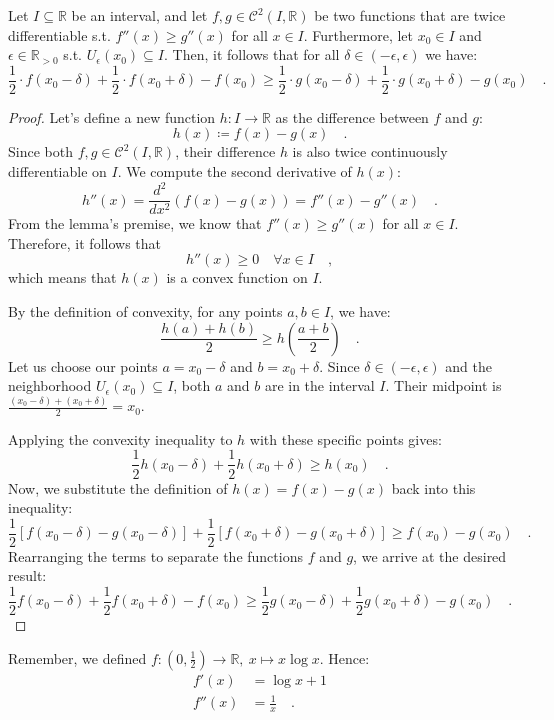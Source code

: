\documentclass[../../main.tex]{subfiles}
\begin{document}
\begin{lemma}
    \label{lemma:convex_function_bound}
    Let $I \subseteq \mathbb{R}$ be an interval, and let $f, g \in \mathcal{C}^2(I, \mathbb{R})$ be two functions that are twice differentiable s.t. $f''(x) \geq g''(x)$ for all $x \in I$. Furthermore, let $x_0 \in I$ and $\epsilon \in \mathbb{R}_{>0}$ s.t. $U_\epsilon(x_0) \subseteq I$. Then, it follows that for all $\delta \in (-\epsilon, \epsilon)$ we have:
    \[
        \frac{1}{2} \cdot f(x_0 - \delta) + \frac{1}{2} \cdot f(x_0 + \delta) - f(x_0) \geq \frac{1}{2} \cdot g(x_0 - \delta) + \frac{1}{2} \cdot g(x_0 + \delta) - g(x_0) \quad .
    \]
\end{lemma}
\begin{proof}
Let's define a new function $h: I \to \mathbb{R}$ as the difference between $f$ and $g$:
\[
    h(x) \coloneqq f(x) - g(x) \quad .
\]
Since both $f, g \in \mathcal{C}^2(I, \mathbb{R})$, their difference $h$ is also twice continuously differentiable on $I$. We compute the second derivative of $h(x)$:
\[
    h''(x) = \frac{d^2}{dx^2}(f(x) - g(x)) = f''(x) - g''(x) \quad .
\]
From the lemma's premise, we know that $f''(x) \geq g''(x)$ for all $x \in I$. Therefore, it follows that
\[
    h''(x) \geq 0 \quad \forall x \in I \quad ,
\]
which means that $h(x)$ is a convex function on $I$.

By the definition of convexity, for any points $a, b \in I$, we have:
\[
    \frac{h(a) + h(b)}{2} \geq h\left(\frac{a+b}{2}\right) \quad .
\]
Let us choose our points $a = x_0 - \delta$ and $b = x_0 + \delta$. Since $\delta \in (-\epsilon, \epsilon)$ and the neighborhood $U_\epsilon(x_0) \subseteq I$, both $a$ and $b$ are in the interval $I$. Their midpoint is $\frac{(x_0 - \delta) + (x_0 + \delta)}{2} = x_0$.

Applying the convexity inequality to $h$ with these specific points gives:
\[
    \frac{1}{2} h(x_0 - \delta) + \frac{1}{2} h(x_0 + \delta) \geq h(x_0) \quad .
\]
Now, we substitute the definition of $h(x) = f(x) - g(x)$ back into this inequality:
\[
    \frac{1}{2} [f(x_0 - \delta) - g(x_0 - \delta)] + \frac{1}{2} [f(x_0 + \delta) - g(x_0 + \delta)] \geq f(x_0) - g(x_0) \quad .
\]
Rearranging the terms to separate the functions $f$ and $g$, we arrive at the desired result:
\[
    \frac{1}{2} f(x_0 - \delta) + \frac{1}{2} f(x_0 + \delta) - f(x_0) \geq \frac{1}{2} g(x_0 - \delta) + \frac{1}{2} g(x_0 + \delta) - g(x_0) \quad .
\]
\end{proof}

Remember, we defined $f: (0, \frac{1}{2}) \to \mathbb{R}, \ x \mapsto x \log x$. Hence:
\begin{align*}
    f'(x) &= \log x + 1 \\
    f''(x) &= \frac{1}{x} \quad .
\end{align*}
\end{document}
